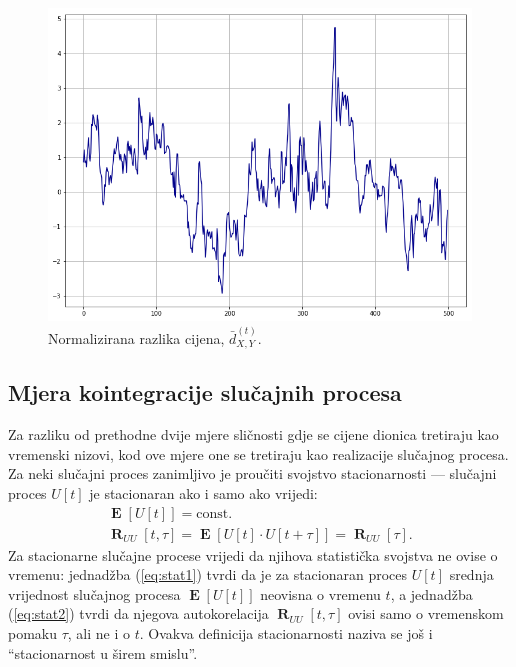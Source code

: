 \documentclass[lmodern, utf8, diplomski, numeric]{fer}
\newcommand{\E}[1]{\operatorname{\mathbf{E}}\left[#1\right]}
\newcommand{\norm}[1]{\bar{#1}}
\newcommand{\R}[2]{\operatorname{\mathbf{R}}_{#1}\left[#2\right]}
\begin{document}
  \begin{figure}[H]
    \centering
    \includegraphics[width=1.0\linewidth]{graphics/diff-norm.png}
    \caption{
      Normalizirana razlika cijena, $\norm{d}_{X,Y}^{\left(t\right)}$.}
  \end{figure}
  
  \subsection{Mjera kointegracije slučajnih procesa}
  Za razliku od prethodne dvije mjere sličnosti gdje se cijene dionica tretiraju kao vremenski nizovi, kod ove mjere one se tretiraju kao realizacije slučajnog procesa.
  Za neki slučajni proces zanimljivo je proučiti svojstvo stacionarnosti --- slučajni proces $U\left[t\right]$ je stacionaran ako i samo ako vrijedi:
  \begin{gather}
  \label{eq:stat1}
  \E{U\left[t\right]} = \mathrm{const.}\\
  \label{eq:stat2}
  \R{UU}{t, \tau} = \E{U\left[t\right] \cdot U\left[t + \tau\right]} = \R{UU}{\tau}.
  \end{gather}
  Za stacionarne slučajne procese vrijedi da njihova statistička svojstva ne ovise o vremenu:
  jednadžba (\ref{eq:stat1}) tvrdi da je za stacionaran proces $U\left[t\right]$ srednja vrijednost slučajnog procesa $\E{U\left[t\right]}$ neovisna o vremenu $t$, a jednadžba (\ref{eq:stat2}) tvrdi da njegova autokorelacija $\R{UU}{t, \tau}$ ovisi samo o vremenskom pomaku $\tau$, ali ne i o $t$.
  Ovakva definicija stacionarnosti naziva se još i ``stacionarnost u širem smislu''.
  
\end{document}
